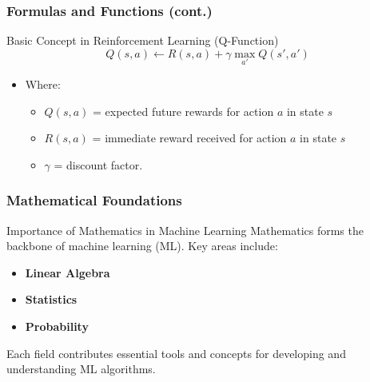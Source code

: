 \documentclass{beamer}
\begin{document}
\begin{frame}[fragile]
    \frametitle{Formulas and Functions (cont.)}
    \begin{block}{Basic Concept in Reinforcement Learning (Q-Function)}
        \begin{equation}
            Q(s, a) \leftarrow R(s, a) + \gamma \max_{a'} Q(s', a')
        \end{equation}
    \end{block}
    \begin{itemize}
        \item Where:
            \begin{itemize}
                \item $Q(s, a)$ = expected future rewards for action $a$ in state $s$
                \item $R(s, a)$ = immediate reward received for action $a$ in state $s$
                \item $\gamma$ = discount factor.
            \end{itemize}
    \end{itemize}
\end{frame}

\begin{frame}[fragile]
    \frametitle{Mathematical Foundations}
    
    \begin{block}{Importance of Mathematics in Machine Learning}
        Mathematics forms the backbone of machine learning (ML). Key areas include:
        \begin{itemize}
            \item \textbf{Linear Algebra}
            \item \textbf{Statistics}
            \item \textbf{Probability}
        \end{itemize}
        Each field contributes essential tools and concepts for developing and understanding ML algorithms.
    \end{block}
\end{frame}
\end{document}
